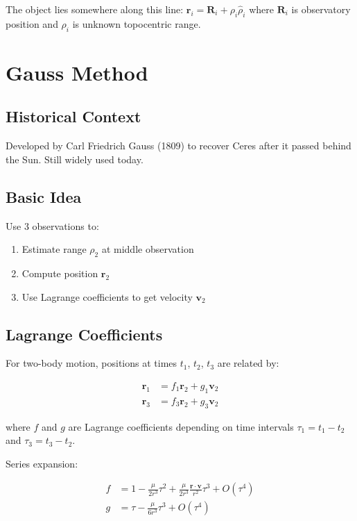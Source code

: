The object lies somewhere along this line: $\mathbf{r}_i = \mathbf{R}_i + \rho_i \hat{\rho}_i$ where $\mathbf{R}_i$ is observatory position and $\rho_i$ is unknown topocentric range.

\section{Gauss Method}

\subsection{Historical Context}

Developed by Carl Friedrich Gauss (1809) to recover Ceres after it passed behind the Sun. Still widely used today.

\subsection{Basic Idea}

Use 3 observations to:
\begin{enumerate}
    \item Estimate range $\rho_2$ at middle observation
    \item Compute position $\mathbf{r}_2$
    \item Use Lagrange coefficients to get velocity $\mathbf{v}_2$
\end{enumerate}

\subsection{Lagrange Coefficients}

For two-body motion, positions at times $t_1$, $t_2$, $t_3$ are related by:

\begin{align}
    \mathbf{r}_1 &= f_1 \mathbf{r}_2 + g_1 \mathbf{v}_2 \\
    \mathbf{r}_3 &= f_3 \mathbf{r}_2 + g_3 \mathbf{v}_2
\end{align}

where $f$ and $g$ are Lagrange coefficients depending on time intervals $\tau_1 = t_1 - t_2$ and $\tau_3 = t_3 - t_2$.

Series expansion:

\begin{align}
    f &= 1 - \frac{\mu}{2r^3}\tau^2 + \frac{\mu}{2r^3}\frac{\mathbf{r} \cdot \mathbf{v}}{r^2}\tau^3 + O(\tau^4) \\
    g &= \tau - \frac{\mu}{6r^3}\tau^3 + O(\tau^4)
\end{align}

